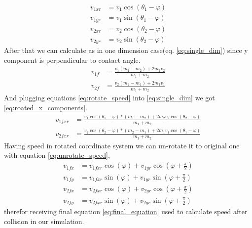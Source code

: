 \documentclass[]{report}
\begin{document}
\begin{equation}
\begin{aligned}
\label{eq:rotate_speed}
	v_{1xr} &= v_1 \cos(\theta_1 - \varphi) \\
	v_{1yr} &= v_1 \sin(\theta_1 - \varphi) \\
	v_{2xr} &= v_2 \cos(\theta_2 - \varphi) \\
	v_{2yr} &= v_2 \sin(\theta_2 - \varphi) 
\end{aligned}
\end{equation}
After that we can calculate as in one dimension case(eq. \ref{eq:single_dim}) since y component is perpendicular to contact angle.
\begin{equation}
\begin{aligned}
\label{eq:single_dim}
v_{1f} &= \frac{v_1(m_1-m_2) + 2m_2v_2}{m_1+m_2} \\
v_{2f} &= \frac{v_2(m_2-m_1) + 2m_1v_1}{m_1+m_2}
\end{aligned}
\end{equation}
And plugging equations \ref{eq:rotate_speed} into \ref{eq:single_dim} we got \ref{eq:roated_x_components}.
\begin{equation}
\begin{aligned}
\label{eq:roated_x_components}
v_{1fxr} &= \frac{v_1 \cos(\theta_1 - \varphi)*(m_1-m_2) + 2m_2 v_2 \cos(\theta_2 - \varphi)}{m_1+m_2} \\
v_{2fxr} &= \frac{v_2 \cos(\theta_2 - \varphi)*(m_2-m_1) + 2m_1 v_1 \cos(\theta_1 - \varphi)}{m_1+m_2}
\end{aligned}
\end{equation}
Having speed in rotated coordinate system we can un-rotate it to original one with equation \ref{eq:unrotate_speed},
\begin{equation}
\begin{aligned}
\label{eq:unrotate_speed}
v_{1fx} &= v_{1fxr} \cos(\varphi) + v_{1yr} \cos(\varphi + \frac{\pi}{2}) \\
v_{1fy} &= v_{1fxr} \sin(\varphi) + v_{1yr} \sin(\varphi + \frac{\pi}{2}) \\
v_{2fx} &= v_{2fxr} \cos(\varphi) + v_{2yr} \cos(\varphi + \frac{\pi}{2}) \\
v_{2fy} &= v_{2fxr} \sin(\varphi) + v_{2yr} \sin(\varphi + \frac{\pi}{2}) 
\end{aligned}
\end{equation}
therefor receiving final equation \ref{eq:final_equation} used to calculate speed after collision in our simulation.
\end{document}
